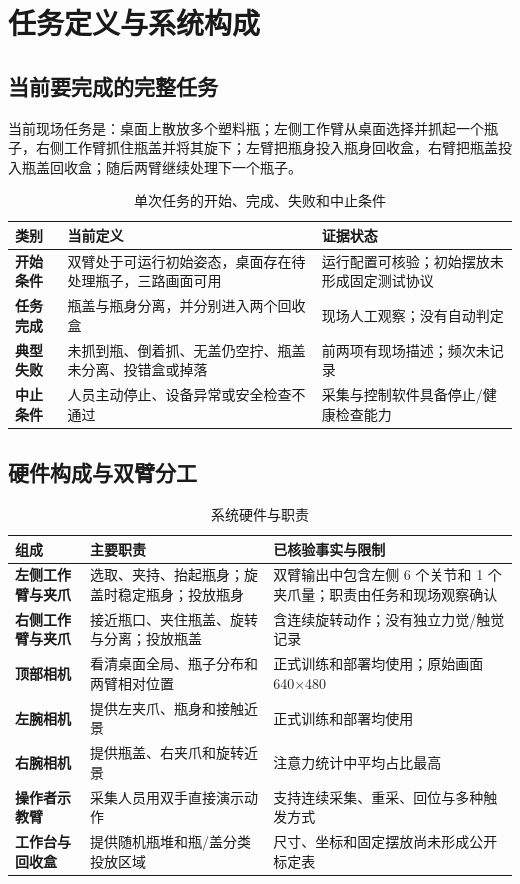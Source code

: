 \chapter{任务定义与系统构成}

\section{当前要完成的完整任务}

当前现场任务是：桌面上散放多个塑料瓶；左侧工作臂从桌面选择并抓起一个瓶子，右侧工作臂抓住瓶盖并将其旋下；左臂把瓶身投入瓶身回收盒，右臂把瓶盖投入瓶盖回收盒；随后两臂继续处理下一个瓶子。

\begin{table}[H]
\centering
\caption{单次任务的开始、完成、失败和中止条件}
\begin{tabularx}{\textwidth}{>{\bfseries}p{26mm}X p{39mm}}
\toprule
类别 & 当前定义 & 证据状态\\
\midrule
开始条件 & 双臂处于可运行初始姿态，桌面存在待处理瓶子，三路画面可用 & 运行配置可核验；初始摆放未形成固定测试协议\\
任务完成 & 瓶盖与瓶身分离，并分别进入两个回收盒 & 现场人工观察；没有自动判定\\
典型失败 & 未抓到瓶、倒着抓、无盖仍空拧、瓶盖未分离、投错盒或掉落 & 前两项有现场描述；频次未记录\\
中止条件 & 人员主动停止、设备异常或安全检查不通过 & 采集与控制软件具备停止/健康检查能力\\
\bottomrule
\end{tabularx}
\end{table}

\section{硬件构成与双臂分工}

\begin{table}[H]
\centering
\caption{系统硬件与职责}
\begin{tabularx}{\textwidth}{>{\bfseries}p{30mm}p{39mm}X}
\toprule
组成 & 主要职责 & 已核验事实与限制\\
\midrule
左侧工作臂与夹爪 & 选取、夹持、抬起瓶身；旋盖时稳定瓶身；投放瓶身 & 双臂输出中包含左侧 6 个关节和 1 个夹爪量；职责由任务和现场观察确认\\
右侧工作臂与夹爪 & 接近瓶口、夹住瓶盖、旋转与分离；投放瓶盖 & 含连续旋转动作；没有独立力觉/触觉记录\\
顶部相机 & 看清桌面全局、瓶子分布和两臂相对位置 & 正式训练和部署均使用；原始画面 640$\times$480\\
左腕相机 & 提供左夹爪、瓶身和接触近景 & 正式训练和部署均使用\\
右腕相机 & 提供瓶盖、右夹爪和旋转近景 & 注意力统计中平均占比最高\\
操作者示教臂 & 采集人员用双手直接演示动作 & 支持连续采集、重采、回位与多种触发方式\\
工作台与回收盒 & 提供随机瓶堆和瓶/盖分类投放区域 & 尺寸、坐标和固定摆放尚未形成公开标定表\\
\bottomrule
\end{tabularx}
\end{table}


